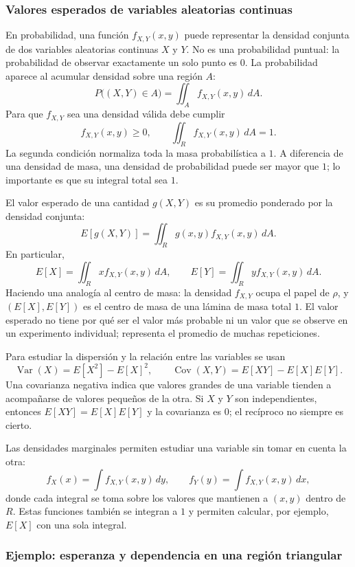 \subsubsection*{Valores esperados de variables aleatorias continuas}

En probabilidad, una función $f_{X,Y}(x,y)$ puede representar la densidad conjunta de dos variables aleatorias continuas $X$ y $Y$. No es una probabilidad puntual: la probabilidad de observar exactamente un solo punto es $0$. La probabilidad aparece al acumular densidad sobre una región $A$:
\[
P\bigl((X,Y)\in A\bigr)=\iint_A f_{X,Y}(x,y)\,dA.
\]
Para que $f_{X,Y}$ sea una densidad válida debe cumplir
\[
f_{X,Y}(x,y)\geq0,
\qquad
\iint_R f_{X,Y}(x,y)\,dA=1.
\]
La segunda condición normaliza toda la masa probabilística a $1$. A diferencia de una densidad de masa, una densidad de probabilidad puede ser mayor que $1$; lo importante es que su integral total sea $1$.

El valor esperado de una cantidad $g(X,Y)$ es su promedio ponderado por la densidad conjunta:
\[
E[g(X,Y)]=\iint_R g(x,y)f_{X,Y}(x,y)\,dA.
\]
En particular,
\[
E[X]=\iint_R x f_{X,Y}(x,y)\,dA,
\qquad
E[Y]=\iint_R y f_{X,Y}(x,y)\,dA.
\]
Haciendo una analogía al centro de masa: la densidad $f_{X,Y}$ ocupa el papel de $\rho$, y $(E[X],E[Y])$ es el centro de masa de una lámina de masa total $1$. El valor esperado no tiene por qué ser el valor más probable ni un valor que se observe en un experimento individual; representa el promedio de muchas repeticiones.

Para estudiar la dispersión y la relación entre las variables se usan
\[
\operatorname{Var}(X)=E[X^2]-E[X]^2,
\qquad
\operatorname{Cov}(X,Y)=E[XY]-E[X]E[Y].
\]
Una covarianza negativa indica que valores grandes de una variable tienden a acompañarse de valores pequeños de la otra. Si $X$ y $Y$ son independientes, entonces $E[XY]=E[X]E[Y]$ y la covarianza es $0$; el recíproco no siempre es cierto.

Las densidades marginales permiten estudiar una variable sin tomar en cuenta la otra:
\[
f_X(x)=\int f_{X,Y}(x,y)\,dy,
\qquad
f_Y(y)=\int f_{X,Y}(x,y)\,dx,
\]
donde cada integral se toma sobre los valores que mantienen a $(x,y)$ dentro de $R$. Estas funciones también se integran a $1$ y permiten calcular, por ejemplo, $E[X]$ con una sola integral.

\subsubsection*{Ejemplo: esperanza y dependencia en una región triangular}

